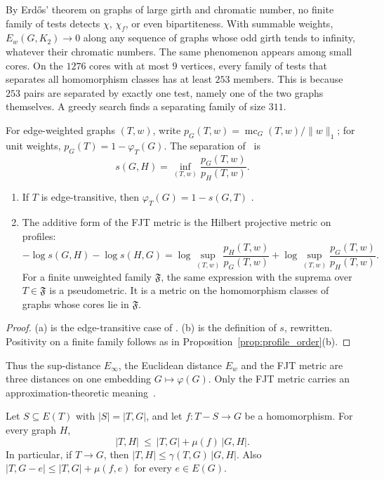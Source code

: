 By Erd\H{o}s' theorem on graphs of large girth and chromatic number,
no finite family of tests detects $\chi$, $\chi_f$, or even
bipartiteness.  With summable weights, $E_w(G,K_2)\to0$ along any sequence
of graphs whose odd girth tends to infinity, whatever their chromatic
numbers.
The same phenomenon appears among small cores.  On the $1276$ cores
with at most $9$ vertices, every family of tests that separates all
homomorphism classes has at least $253$ members.  This is because $253$
pairs are separated by exactly one test, namely one of the two graphs
themselves.  A greedy search finds a separating family of size $311$.

\begin{proposition}
\label{prop:profile_fjt}
For edge-weighted graphs $(T,w)$, write
$p_G(T,w)=\operatorname{mc}_G(T,w)/\|w\|_1$; for unit weights,
$p_G(T)=1-\varphi_T(G)$.  The separation
of~\cite{fjt2009,efjt2015} is
\[
  s(G,H)=\inf_{(T,w)}\frac{p_G(T,w)}{p_H(T,w)}.
\]
\begin{enumerate}
\item[(a)] If $T$ is edge-transitive, then $\varphi_T(G)=1-s(G,T)$
      \cite[Thm.~2.1]{efjt2015}.
\item[(b)] The additive form of the FJT metric is the Hilbert projective
      metric on profiles:
      \[
        -\log s(G,H)-\log s(H,G)
        =\log\sup_{(T,w)}\frac{p_H(T,w)}{p_G(T,w)}
        +\log\sup_{(T,w)}\frac{p_G(T,w)}{p_H(T,w)}.
      \]
      For a finite unweighted family $\mathfrak F$, the same expression with
      the suprema over $T\in\mathfrak F$ is a pseudometric.  It is a metric on
      the homomorphism classes of graphs whose cores lie in $\mathfrak F$.
\end{enumerate}
\end{proposition}

\begin{proof}
(a) is the edge-transitive case of \cite[Thm.~2.1]{efjt2015}.
(b) is the definition of $s$, rewritten.  Positivity on a finite family
follows as in Proposition~\ref{prop:profile_order}(b).
\end{proof}

Thus the sup-distance $E_\infty$, the Euclidean distance $E_w$ and the FJT metric
are three distances on one embedding $G\mapsto\varphi(G)$.  Only the FJT
metric carries an approximation-theoretic meaning~\cite[Lemma~1.6]{efjt2015}.

\begin{proposition}
\label{prop:profile_lip}
Let $S\subseteq E(T)$ with $|S|=|T,G|$, and let $f\colon T-S\to G$ be a
homomorphism.  For every graph $H$,
\[
  |T,H|\ \le\ |T,G|+\mu(f)\,|G,H|.
\]
In particular, if $T\to G$, then $|T,H|\le\gamma(T,G)\,|G,H|$.  Also
$|T,G-e|\le|T,G|+\mu(f,e)$ for every $e\in E(G)$.
\end{proposition}

